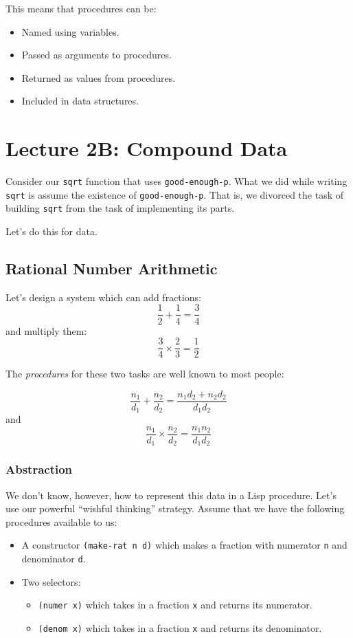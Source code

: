 \documentclass[9pt]{report}
\begin{document}
This means that procedures can be:
\begin{itemize}
\item Named using variables.
\item Passed as arguments to procedures.
\item Returned as values from procedures.
\item Included in data structures.
\end{itemize}

\chapter{Lecture 2B: Compound Data}
\label{sec:org218305b}

Consider our \texttt{sqrt} function that uses \texttt{good-enough-p}. What we did
while writing \texttt{sqrt} is assume the existence of \texttt{good-enough-p}.
That is, we divorced the task of building \texttt{sqrt} from the task of
implementing its parts.

Let's do this for data.

\section{Rational Number Arithmetic}
\label{sec:orga7bcf8d}

Let's design a system which can add fractions:
$$\frac{1}{2}+\frac{1}{4}=\frac{3}{4}$$
and multiply them:
$$\frac{3}{4}\times \frac{2}{3} = \frac{1}{2}$$

The \emph{procedures} for these two tasks are well known to most people:

$$\frac{n_1}{d_1} + \frac{n_2}{d_2} = \frac{n_1d_2+n_2d_2}{d_1d_2}$$
and
$$\frac{n_1}{d_1} \times \frac{n_2}{d_2} = \frac{n_1n_2}{d_1d_2}$$

\subsection{Abstraction}
\label{sec:orgff37f40}
We don't know, however, how to represent this data in a Lisp
procedure. Let's use our powerful ``wishful thinking'' strategy.
Assume that we have the following procedures available to us:

\begin{itemize}
\item A constructor \texttt{(make-rat n d)} which makes a fraction with
numerator \texttt{n} and denominator \texttt{d}.
\item Two selectors:
\begin{itemize}
\item \texttt{(numer x)} which takes in a fraction \texttt{x} and returns its
numerator.
\item \texttt{(denom x)} which takes in a fraction \texttt{x} and returns its
denominator.
\end{itemize}
\end{itemize}
\end{document}
